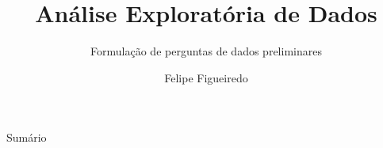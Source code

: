 \documentclass{beamer}
\title%
{Análise Exploratória de Dados}
\subtitle
{Formulação de perguntas de dados preliminares} %
\author%
{Felipe Figueiredo}%
\institute[INTO] %
{Instituto Nacional de Traumatologia e Ortopedia
}
\date%
{}
\begin{document}
\begin{frame}
  \titlepage
\end{frame}

\begin{frame}{Sumário}
  \tableofcontents
\end{frame}








\end{document}
